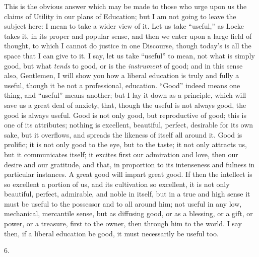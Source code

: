 This is the obvious answer which may be made to those who urge upon
us the claims of Utility in our plans of Education; but I am not going
to leave the subject here: I mean to take a wider view of it. Let us
take ``useful,'' as Locke takes it, in its proper and popular
sense, and then we enter upon a large field of thought, to which I
cannot do justice in one Discourse, though today's is all the space
that I can give to it. I say, let us take ``useful'' to mean,
not what is simply good, but what \emph{tends} to good, or is
the \emph{instrument} of good; and in this sense also, Gentlemen, I
will show you how a liberal education is truly and fully a useful,
though it be not a professional, education. ``Good'' indeed
means one thing, and ``useful'' means another; but I lay it
down as a principle, which will save us a great deal of anxiety, that,
though the useful is not always good, the good is always useful. Good
is not only good, but reproductive of good; this is one of its
attributes; nothing is excellent, beautiful, perfect, desirable for
its own sake, but it overflows, and spreads the likeness of itself all
around it. Good is prolific; it is not only good to the eye, but to
the taste; it not only attracts us, but it communicates itself; it
excites first our admiration and love, then our desire and our
gratitude, and that, in proportion to its intenseness and fulness in
particular instances. A great good will impart great good. If then the
intellect is so excellent a portion of us, and its cultivation so
excellent, it is not only beautiful, perfect, admirable, and noble in
itself, but in a true and high sense it must be useful to the
possessor and to all around him; not useful in any low, mechanical,
mercantile sense, but as diffusing good, or as a blessing, or a gift,
or power, or a treasure, first to the owner, then through him to the
world. I say then, if a liberal education be good, it must necessarily
be useful too.

6.


